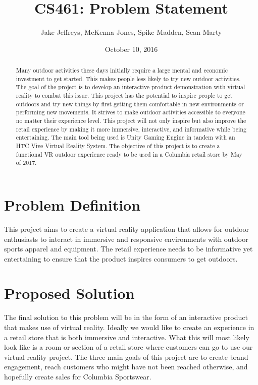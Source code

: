 \documentclass[letterpaper,10pt,titlepage]{article}
\title{CS461: Problem Statement}
\author{Jake Jeffreys, McKenna Jones, Spike Madden, Sean Marty}
\date{October 10, 2016}
\begin{document}
\begin{titlepage}
\maketitle
\begin{abstract}
Many outdoor activities these days initially require a large mental and economic
investment to get started. This makes people less likely to try new outdoor
activities. The goal of the project is to develop an interactive product
demonstration with virtual reality to combat this issue. This project has the
potential to inspire people to get outdoors and try new things by first getting
them comfortable in new environments or performing new movements. It strives to
make outdoor activities accessible to everyone no matter their experience level.
This project will not only inspire but also improve the retail experience by
making it more immersive, interactive, and informative while being
entertaining. The main tool being used is Unity Gaming Engine in tandem with an
HTC Vive Virtual Reality System. The objective of this project is to create a
functional VR outdoor experience ready to be used in a Columbia retail store by
May of 2017.
\end{abstract}
\end{titlepage}

\section{Problem Definition}
This project aims to create a virtual reality application that allows for
outdoor enthusiasts to interact in immersive and responsive environments with
outdoor sports apparel and equipment. The retail experience needs to be
informative yet entertaining to ensure that the product inspires consumers to
get outdoors.

\section{Proposed Solution}

The final solution to this problem will be in the form of an interactive
product that makes use of virtual reality. Ideally we would like to create an
experience in a retail store that is both immersive and interactive. What this
will most likely look like is a room or section of a retail store where
customers can go to use our virtual reality project. The three main goals of
this project are to create brand engagement, reach customers who might have not
been reached otherwise, and hopefully create sales for Columbia Sportswear.
\end{document}
